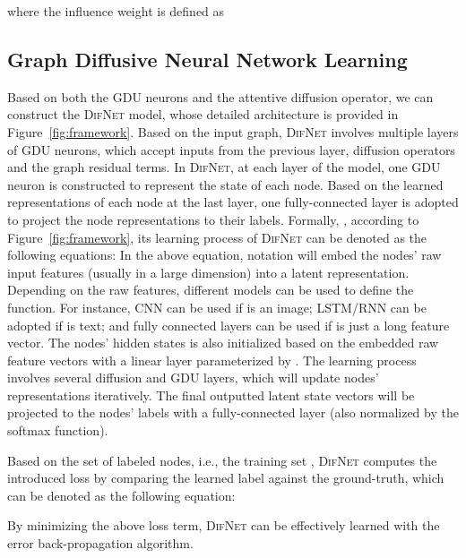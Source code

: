 \documentclass{article}
\newcommand{\our}{\textsc{DifNet}}
\newcommand{\gdu}{\textsc{GDU}}
\begin{document}
where the influence weight  is defined as





\subsection{Graph Diffusive Neural Network Learning}

Based on both the {\gdu} neurons and the attentive diffusion operator, we can construct the {\our} model, whose detailed architecture is provided in Figure~\ref{fig:framework}. Based on the input graph, {\our} involves multiple layers of {\gdu} neurons, which accept inputs from the previous layer, diffusion operators and the graph residual terms. In {\our}, at each layer of the model, one {\gdu} neuron is constructed to represent the state of each node. Based on the learned representations of each node at the last layer, one fully-connected layer is adopted to project the node representations to their labels. Formally, , according to Figure~\ref{fig:framework}, its learning process of {\our} can be denoted as the following equations:\begingroup\makeatletter\def\f@size{8.0}\check@mathfonts
\endgroup
In the above equation, notation  will embed the nodes' raw input features (usually in a large dimension) into a latent representation. Depending on the raw features, different models can be used to define the  function. For instance, CNN can be used if  is an image; LSTM/RNN can be adopted if  is text; and fully connected layers can be used if  is just a long feature vector. The nodes' hidden states  is also initialized based on the embedded raw feature vectors with a linear layer parameterized by . The learning process involves several diffusion and {\gdu} layers, which will update nodes' representations iteratively. The final outputted latent state vectors will be projected to the nodes' labels with a fully-connected layer (also normalized by the softmax function).

Based on the set of labeled nodes, i.e., the training set , {\our} computes the introduced loss by comparing the learned label against the ground-truth, which can be denoted as the following equation: \vspace{-9pt}

By minimizing the above loss term, {\our} can be effectively learned with the error back-propagation algorithm. 
\end{document}

